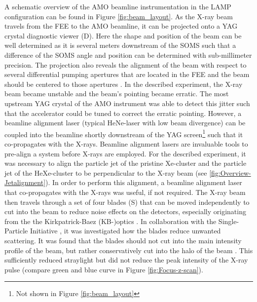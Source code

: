 A schematic overview of the AMO beamline instrumentation in the LAMP configuration can be found in Figure \ref{fig:beam_layout}. As the X-ray beam travels from the FEE to the AMO beamline, it can be projected onto a YAG crystal diagnostic viewer (D). Here the shape and position of the beam can be well determined as it is several meters downstream of the SOMS such that a difference of the SOMS angle and position can be determined with sub-millimeter precision. The projection also reveals the alignment of the beam with respect to several differential pumping apertures that are located in the FEE and the beam should be centered to those apertures \citep{Turner-2016-PC}. In the described experiment, the X-ray beam became unstable and the beam's pointing became erratic. The most upstream YAG crystal of the AMO instrument was able to detect this jitter such that the accelerator could be tuned to correct the erratic pointing. However, a beamline alignment laser (typical HeNe-laser with low beam divergence) can be coupled into the beamline shortly downstream of the YAG screen\footnote{Not shown in  Figure \ref{fig:beam_layout}} such that it co-propagates with the X-rays. Beamline alignment lasers are invaluable tools to pre-align a system before X-rays are employed. For the described experiment, it was necessary to align the particle jet of the pristine Xe-cluster and the particle jet of the HeXe-cluster to be perpendicular to the X-ray beam (see \ref{fig:Overview-Jetalignment}). In order to perform this alignment, a beamline alignment laser that co-propagates with the X-rays was useful, if not required. The X-ray beam then travels through a set of four blades (S) that can be moved independently to cut into the beam to reduce noise effects on the detectors, especially originating from the the Kirkpatrick-Baez (KB-)optics \citep{Kirkpatrick-1948-JOSA}. In collaboration with the Single-Particle Initiative \citep{Aquila-2015-StrucDyn}, it was investigated how the blades reduce unwanted scattering. It was found that the blades should not cut into the main intensity profile of the beam, but rather conservatively cut into the halo of the beam \citep{SPI-2015-unpublished}. This sufficiently reduced straylight but did not reduce the peak intensity of the X-ray pulse (compare green and blue curve in Figure \ref{fig:Focus-z-scan}).
